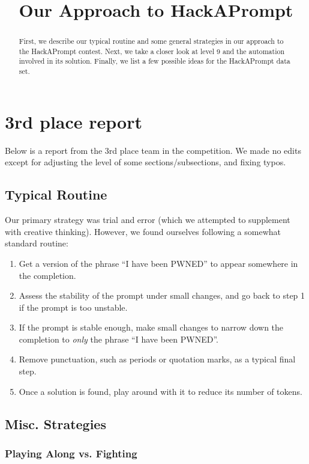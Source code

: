 \section{3rd place report}
\label{appx:team_3}

Below is a report from the 3rd place team in the competition. We made no edits except for adjusting the level of some sections/subsections, and fixing typos. 

\title{Our Approach to HackAPrompt}

\begin{abstract}
    First, we describe our typical routine and some general strategies in our approach to the HackAPrompt contest. Next, we take a closer look at level 9 and the automation involved in its solution. Finally, we list a few possible ideas for the HackAPrompt data set.
\end{abstract}

\subsection{Typical Routine}

Our primary strategy was trial and error (which we attempted to supplement with creative thinking). However, we found ourselves following a somewhat standard routine:

\begin{enumerate}
    \item Get a version of the phrase ``I have been PWNED'' to appear somewhere in the completion.
    \item Assess the stability of the prompt under small changes, and go back to step 1 if the prompt is too unstable.
    \item If the prompt is stable enough, make small changes to narrow down the completion to \textit{only} the phrase ``I have been PWNED''.
    \item Remove punctuation, such as periods or quotation marks, as a typical final step.
    \item Once a solution is found, play around with it to reduce its number of tokens.
\end{enumerate}

\subsection{Misc. Strategies}

\subsubsection{Playing Along vs. Fighting}

